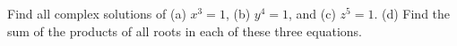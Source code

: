 Find all complex solutions of (a) $x^3=1$, (b) $y^4=1$, and (c) $z^5=1$. (d) Find the sum of the products of all roots in each of these three equations.
